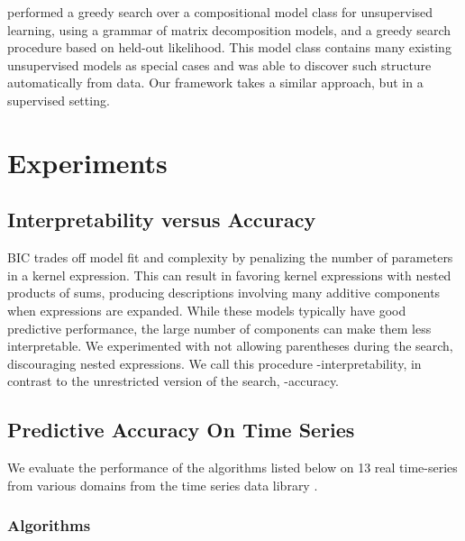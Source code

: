\citet{grosse2012exploiting} performed a greedy search over a compositional model class for unsupervised learning, using a grammar of matrix decomposition models, and a greedy search procedure based on held-out likelihood.
This model class contains many existing unsupervised models as special cases and was able to discover such structure automatically from data.
Our framework takes a similar approach, but in a supervised setting.






\section{Experiments}
\label{sec:numerical}

\subsection{Interpretability versus Accuracy}

BIC trades off model fit and complexity by penalizing the number of parameters in a kernel expression.
This can result in \procedurename{} favoring kernel expressions with nested products of sums, producing descriptions involving many additive components when expressions are expanded.
While these models typically have good predictive performance, the large number of components can make them less interpretable.
We experimented with not allowing parentheses during the search, discouraging nested expressions.
We call this procedure \procedurename{}-interpretability, in contrast to the unrestricted version of the search, \procedurename{}-accuracy.


\subsection{Predictive Accuracy On Time Series}



We evaluate the performance of the algorithms listed below on 13 real time-series from various domains from the time series data library \citep{TSDL}.



\subsubsection{Algorithms}

